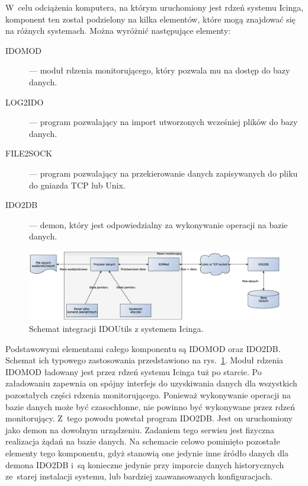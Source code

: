 W~celu odciążenia komputera, na którym uruchomiony jest rdzeń systemu
Icinga, komponent ten został podzielony na kilka elementów, które mogą
znajdować się na różnych systemach. Można wyróżnić następujące
elementy:

\begin{description}
\item[IDOMOD] --- moduł rdzenia monitorującego, który pozwala mu na dostęp
  do bazy danych.
\item[LOG2IDO] --- program pozwalający na import utworzonych wcześniej
  plików do bazy danych.
\item[FILE2SOCK] --- program pozwalający na przekierowanie danych
  zapisywanych do pliku do gniazda TCP lub Unix.
\item[IDO2DB] --- demon, który jest odpowiedzialny za wykonywanie operacji
  na bazie danych.
\end{description}

\begin{figure}[ht]
  \caption{Schemat integracji IDOUtils z systemem Icinga.}
  \label{fig:IDOUtilsArch}
\includegraphics[width=1\textwidth]{img/idoutilsArch}
\end{figure}

Podstawowymi elementami całego komponentu są IDOMOD oraz
IDO2DB. Schemat ich typowego zastosowania przedstawiono na
rys.~\ref{fig:IDOUtilsArch}. Moduł rdzenia IDOMOD ładowany jest przez
rdzeń systemu Icinga tuż po starcie. Po załadowaniu zapewnia on spójny
interfejs do uzyskiwania danych dla wszystkich pozostałych części
rdzenia monitorującego. Ponieważ wykonywanie operacji na bazie danych
może być czasochłonne, nie powinno być wykonywane przez rdzeń
monitorujący. Z~tego powodu powstał program IDO2DB. Jest on
uruchomiony jako demon na dowolnym urządzeniu. Zadaniem tego serwisu
jest fizyczna realizacja żądań na bazie danych. Na schemacie celowo
pominięto pozostałe elementy tego komponentu, gdyż stanowią one
jedynie inne źródło danych dla demona IDO2DB i~są konieczne jedynie
przy imporcie danych historycznych ze~starej instalacji systemu, lub
bardziej zaawansowanych konfiguracjach.

